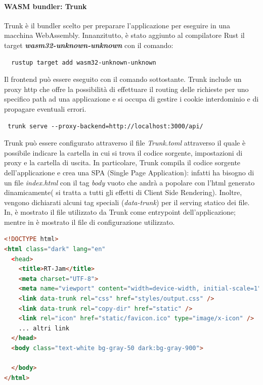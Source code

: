 \documentclass{article}
\begin{document}
\paragraph{WASM bundler: Trunk} Trunk è il bundler scelto per preparare 
l'applicazione per eseguire in una macchina WebAssembly. Innanzitutto, è stato 
aggiunto al compilatore Rust il target \textbf{\textit{wasm32-unknown-unknown}} con il
comando:

\begin{verbatim}
  rustup target add wasm32-unknown-unknown
\end{verbatim}

Il frontend può essere eseguito con il comando sottostante. Trunk include un proxy http che 
offre la possibilità di effettuare il routing delle richieste per uno specifico path ad 
una applicazione e si occupa di gestire i cookie interdominio e di propagare eventuali errori.

\begin{verbatim}
 trunk serve --proxy-backend=http://localhost:3000/api/ 
\end{verbatim}
Trunk può essere configurato attraverso il file \textit{Trunk.toml} attraverso il quale
è possibile indicare la cartella in cui si trova il codice sorgente, impostazioni di proxy 
e la cartella di uscita. In particolare, Trunk compila il codice sorgente dell'applicazione
e crea una SPA (Single Page Application): infatti ha bisogno di un file \textit{index.html}
con il tag \textit{body} vuoto che andrà a popolare con l'html generato dinamicamente(
si tratta a tutti gli effetti di Client Side Rendering). Inoltre,
vengono dichiarati alcuni tag speciali (\textit{data-trunk}) per il serving statico dei file. 
In,  è mostrato il file utilizzato da Trunk come entrypoint dell'applicazione; mentre in è 
mostrato il file di configurazione utilizzato.

\begin{lstlisting}[language=html, style=boxed, label={lst:wasm-entrypoint}, captionpos=b,caption={Entrypoint per applicazione WASM}]
<!DOCTYPE html>
<html class="dark" lang="en"
  <head>
    <title>RT-Jam</title>
    <meta charset="UTF-8">
    <meta name="viewport" content="width=device-width, initial-scale=1">
    <link data-trunk rel="css" href="styles/output.css" />
    <link data-trunk rel="copy-dir" href="static" />
    <link rel="icon" href="static/favicon.ico" type="image/x-icon" />
    ... altri link
  </head>
  <body class="text-white bg-gray-50 dark:bg-gray-900">
  
  </body>
</html>

\end{lstlisting}
\end{document}
